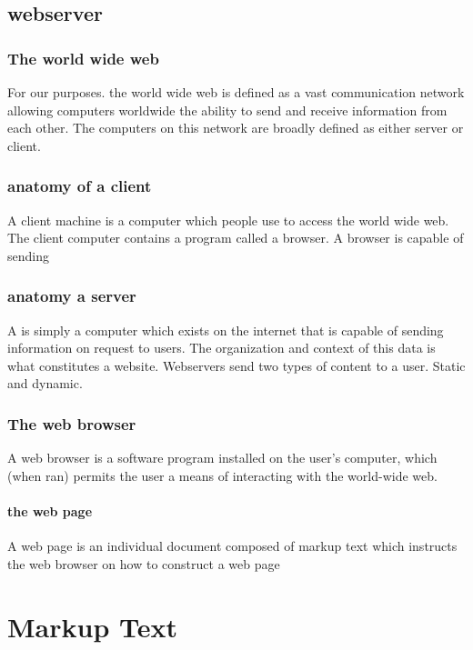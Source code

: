 \section{webserver}

\subsection{The world wide web}

For our purposes. the world wide web is defined as a vast communication network allowing computers worldwide the ability to send and receive information from each other.  The computers on this network are broadly defined as either server or client.

\subsection{anatomy of a client}

A client machine is a computer which people use to access the world wide web.  The client computer contains a program called a browser.  A browser is capable of sending 

\subsection{anatomy a server}

A is simply a computer which exists on the internet that is capable of sending information on request to users.  The organization and context of this data is what constitutes a website.  Webservers send two types of content to a user.  Static and dynamic.

\subsection{The web browser}

A web browser is a software program installed on the user's computer, which (when ran) permits the user a means of interacting with the world-wide web.  


\subsubsection{the web page}

A web page is an individual document composed of markup text which instructs the web browser on how to construct a web page

\chapter{Markup Text}

